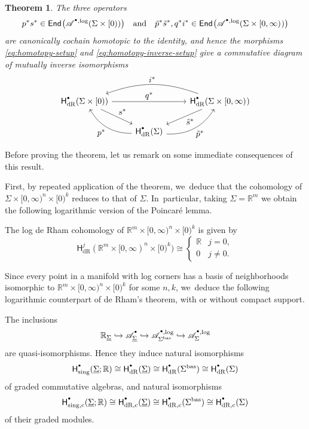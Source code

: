 \documentclass[JEP,XML,SOM,Unicode,NoFloatCountersInSection,published]{cedram}
\let\oldbullet\bullet
\renewcommand{\bullet}{{\raisebox{1pt}{$\scriptscriptstyle\oldbullet$}}}
\let\tst\textstyle
\newcommand\hto{\mathrel{\lhook\joinrel\to}}
\newcommand{\rbirac}[1]{\bigl(#1\bigr)}
\newcommand{\bEnd}[2][]{\mathsf{End}_{#1}\rbirac{#2}}
\newtheorem{theorem}{Theorem}[section]
\theoremstyle{definition}
\theoremstyle{remark}
\newcommand{\RR}{\mathbb{R}}
\newcommand{\model}[2]{\halfspc{#1}\times[0)^{#2}}
\newcommand{\halfspc}[1]{[0,\infty)^{#1}}
\newcommand{\tp}{\tilde p}
\newcommand{\ts}{\tilde s}
\newcommand{\rbrac}[1]{\left(#1\right)}
\newcommand{\cA}[2][\bullet]{\mathscr{A}^{#1}_{#2}}\newcommand{\A}[2][\bullet] {\mathscr{A}^{#1}\rbrac{#2}}
\newcommand{\cAlog}[2][\bullet]{\mathscr{A}^{#1,\log}_{#2}}
\newcommand{\Sig}{\Sigma}
\newcommand{\uSig}{\underline{\Sigma}}
\newcommand{\bas}[1]{{#1}^{\mathrm{bas}}}
\newcommand{\Sigbas}{\bas{\Sig}}
\newcommand{\HdR}[2][\bullet]{\mathsf{H}_{\mathrm{dR}}^{#1}(#2)}
\newcommand{\HdRc}[2][\bullet]{\mathsf{H}_{\mathrm{dR},\mathrm{c}}^{#1}(#2)}
\begin{document}
\begin{theorem}\label{thm:deRham-homotopy}
The three operators\vspace*{-3pt}
\[
p^*s^* \in \bEnd{\cAlog{}(\Sig\times [0))}
\quad
\text{and}
\quad
\tp^*\ts^*,q^* i^* \in \bEnd{\cAlog{}(\Sig\times\halfspc{})}
\]
are canonically cochain homotopic to the identity, and hence the morphisms \eqref{eq:homotopy-setup} and \eqref{eq:homotopy-inverse-setup} give a commutative diagram of mutually inverse isomorphisms\vspace*{-3pt}
\[
\begin{tikzcd}
\HdR{\Sig \times [0)}\ar[rr,"\tst q^*"]\ar[dr,"\tst s^*"] & &\HdR{\Sig\times \halfspc{}} \ar[ll,bend right=20,"\tst i^*"'] \ar[dl,"\tst \ts^*"]\\
& \HdR{\Sig} \ar[ul,"\tst p^*",bend left = 30] \ar[ur,"\tst \tp^*"',bend right = 30]
\end{tikzcd}
\]
\end{theorem}
Before proving the theorem, let us remark on some immediate consequences of this result.

First, by repeated application of the theorem, we~deduce that the cohomology of $\Sig \times \model{n}{k}$ reduces to that of $\Sig$. In~particular, taking $\Sig = \RR^m$ we obtain the following logarithmic version of the Poincaré lemma.
\begin{corollary}
The log de Rham cohomology of $\RR^m \times \model{n}{k}$ is given by
\[
\HdR[j]{\RR^m\times \model{n}{k}} \cong \begin{cases}
\RR & j=0, \\
0 & j \neq 0.
\end{cases}
\]
\end{corollary}

Since every point in a manifold with log corners has a basis of neighborhoods isomorphic to $\RR^m\times\model{n}{k}$ for some $n,k$, we~deduce the following logarithmic counterpart of de Rham's theorem, with or without compact support.

\begin{corollary}\label{cor:log-de-Rham}
The inclusions
\[
\RR_{\uSig} \hto \cA{\uSig} \hto \cAlog{\Sigbas} \hto \cAlog{\Sig}
\]
are quasi-isomorphisms. Hence they induce natural isomorphisms
\[
\mathsf{H}^\bullet_{\mathrm{sing}}(\uSig;\RR) \cong \HdR{\uSig} \cong \HdR{\Sigbas} \cong \HdR{\Sig}
\]
of graded commutative algebras, and natural isomorphisms
\[
\mathsf{H}^\bullet_{\mathrm{sing,c}}(\uSig;\RR)\cong \HdRc{\uSig} \cong \HdRc{\Sigbas} \cong \HdRc{\Sig}
\]
of their graded modules.
\end{corollary}
\end{document}

